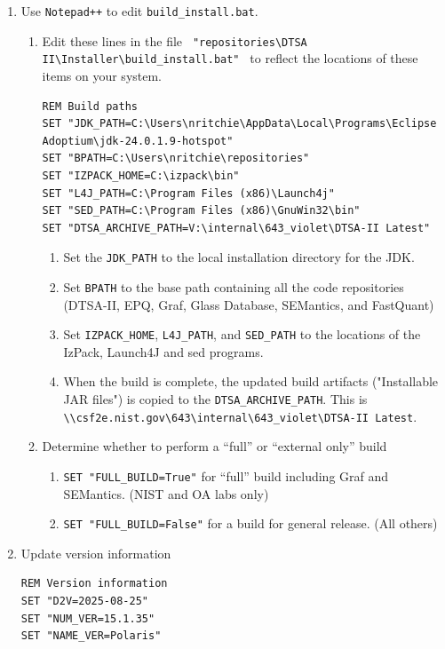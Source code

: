\documentclass{article}
\begin{document}
\begin{enumerate}
    \item Use \verb|Notepad++| to edit \verb|build_install.bat|.
    \begin{enumerate}
        \item Edit these lines in the file \verb| "repositories\DTSA II\Installer\build_install.bat" | to reflect the locations of these items on your system.
        \begin{verbatim}
REM Build paths
SET "JDK_PATH=C:\Users\nritchie\AppData\Local\Programs\Eclipse Adoptium\jdk-24.0.1.9-hotspot"
SET "BPATH=C:\Users\nritchie\repositories"
SET "IZPACK_HOME=C:\izpack\bin"
SET "L4J_PATH=C:\Program Files (x86)\Launch4j"
SET "SED_PATH=C:\Program Files (x86)\GnuWin32\bin"
SET "DTSA_ARCHIVE_PATH=V:\internal\643_violet\DTSA-II Latest"
        \end{verbatim}
        \begin{enumerate}
            \item Set the \verb|JDK_PATH| to the local installation directory for the JDK.
            \item Set \verb|BPATH| to the base path containing all the code repositories (DTSA-II, EPQ, Graf, Glass Database, SEMantics, and FastQuant)
            \item Set \verb|IZPACK_HOME|, \verb|L4J_PATH|, and \verb|SED_PATH| to the locations of the IzPack, Launch4J and sed programs.
            \item When the build is complete, the updated build artifacts ("Installable JAR files") is copied to the \verb|DTSA_ARCHIVE_PATH|.  This is \verb|\\csf2e.nist.gov\643\internal\643_violet\DTSA-II Latest|.
        \end{enumerate}
        \item Determine whether to perform a ``full'' or ``external only'' build
        \begin{enumerate}
            \item \verb|SET "FULL_BUILD=True"| for ``full'' build including Graf and SEMantics. (NIST and OA labs only)
            \item \verb|SET "FULL_BUILD=False"| for a build for general release. (All others)
        \end{enumerate}
    \end{enumerate}
    \item Update version information
        \begin{verbatim}
REM Version information
SET "D2V=2025-08-25"
SET "NUM_VER=15.1.35"
SET "NAME_VER=Polaris"

\end{verbatim}
\end{enumerate}
\end{document}
